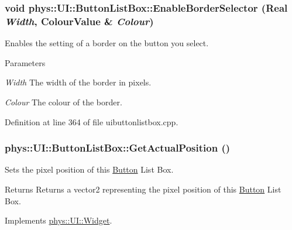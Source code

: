 \hypertarget{classphys_1_1UI_1_1ButtonListBox_a6369d985a45f635d0cd9e9860da407aa}{
\subsubsection[{EnableBorderSelector}]{\setlength{\rightskip}{0pt plus 5cm}void phys::UI::ButtonListBox::EnableBorderSelector ({\bf Real} {\em Width}, \/  {\bf ColourValue} \& {\em Colour})}}
\label{d4/dd7/classphys_1_1UI_1_1ButtonListBox_a6369d985a45f635d0cd9e9860da407aa}


Enables the setting of a border on the button you select. 


\begin{DoxyParams}{Parameters}
\item[{\em Width}]The width of the border in pixels. \item[{\em Colour}]The colour of the border. \end{DoxyParams}


Definition at line 364 of file uibuttonlistbox.cpp.

\hypertarget{classphys_1_1UI_1_1ButtonListBox_addc5d7c6ab2a48ffa0d4b2e46c20d9a5}{
\subsubsection[{GetActualPosition}]{ phys::UI::ButtonListBox::GetActualPosition ()}}
\label{d4/dd7/classphys_1_1UI_1_1ButtonListBox_addc5d7c6ab2a48ffa0d4b2e46c20d9a5}


Sets the pixel position of this \hyperlink{classphys_1_1UI_1_1Button}{Button} List Box. 

\begin{DoxyReturn}{Returns}
Returns a vector2 representing the pixel position of this \hyperlink{classphys_1_1UI_1_1Button}{Button} List Box. 
\end{DoxyReturn}


Implements \hyperlink{classphys_1_1UI_1_1Widget_a0a29fecff7f56d7909f65fd63b0990e7}{phys::UI::Widget}.



